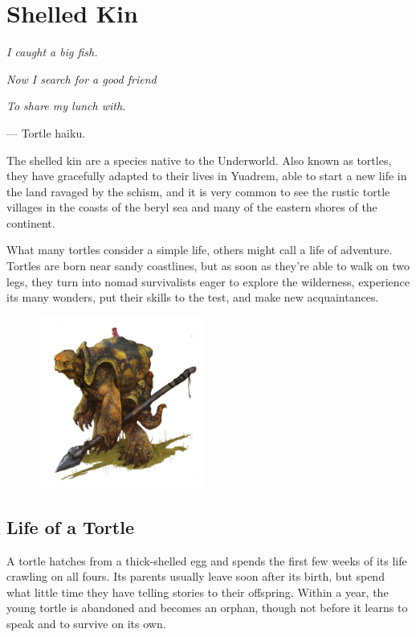 \section{Shelled Kin} \label{sec::shelledkin}

\textit{I caught a big fish.}

\textit{Now I search for a good friend}

\textit{To share my lunch with.}

\hspace*{\fill} --- Tortle haiku.

The shelled kin are a species native to the Underworld.
Also known as tortles, they have gracefully adapted to their lives in Yuadrem, able to start a new life in the land ravaged by the schism, and it is very common to see the rustic tortle villages in the coasts of the beryl sea and many of the eastern shores of the continent.

What many tortles consider a simple life, others might call a life of adventure.
Tortles are born near sandy coastlines, but as soon as they're able to walk on two legs, they turn into nomad survivalists eager to explore the wilderness, experience its many wonders, put their skills to the test, and make new acquaintances.

\begin{figure}[!b]
    \centering
    \includegraphics[width=0.48\textwidth]{04kins/img/17tortle_official.jpg}
\end{figure}

\subsection*{Life of a Tortle}
A tortle hatches from a thick-shelled egg and spends the first few weeks of its life crawling on all fours.
Its parents usually leave soon after its birth, but spend what little time they have telling stories to their offspring.
Within a year, the young tortle is abandoned and becomes an orphan, though not before it learns to speak and to survive on its own.

